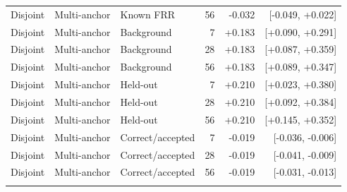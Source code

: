\begin{longtable}{lllrrr}
Disjoint & Multi-anchor & Known FRR & 56 & -0.032 & [-0.049, +0.022] \\
\addlinespace
Disjoint & Multi-anchor & Background & 7 & +0.183 & [+0.090, +0.291] \\
Disjoint & Multi-anchor & Background & 28 & +0.183 & [+0.087, +0.359] \\
Disjoint & Multi-anchor & Background & 56 & +0.183 & [+0.089, +0.347] \\
\addlinespace
Disjoint & Multi-anchor & Held-out & 7 & +0.210 & [+0.023, +0.380] \\
Disjoint & Multi-anchor & Held-out & 28 & +0.210 & [+0.092, +0.384] \\
Disjoint & Multi-anchor & Held-out & 56 & +0.210 & [+0.145, +0.352] \\
\addlinespace
Disjoint & Multi-anchor & Correct/accepted & 7 & -0.019 & [-0.036, -0.006] \\
Disjoint & Multi-anchor & Correct/accepted & 28 & -0.019 & [-0.041, -0.009] \\
Disjoint & Multi-anchor & Correct/accepted & 56 & -0.019 & [-0.031, -0.013] \\
\addlinespace
\end{longtable}
\normalsize
